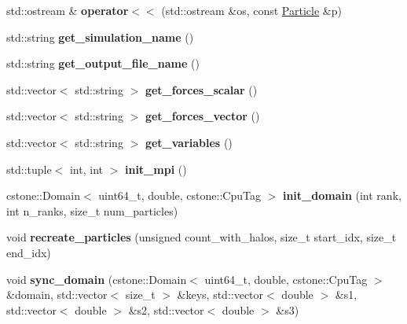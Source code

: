 \begin{DoxyCompactItemize}
\item 
\mbox{\label{namespacewash_abc2f2a24cba2a641e3a2177b85b20953}} 
std\+::ostream \& {\bfseries operator$<$$<$} (std\+::ostream \&os, const \mbox{\hyperlink{classwash_1_1Particle}{Particle}} \&p)
\item 
\mbox{\label{namespacewash_ae53e7d7035c2a890e62ce7687f173222}} 
std\+::string {\bfseries get\+\_\+simulation\+\_\+name} ()
\item 
\mbox{\label{namespacewash_a5ffed72aa633299d2cb1692076563f55}} 
std\+::string {\bfseries get\+\_\+output\+\_\+file\+\_\+name} ()
\item 
\mbox{\label{namespacewash_a0cac03b47f7ed36a343e0d42aa0f013a}} 
std\+::vector$<$ std\+::string $>$ {\bfseries get\+\_\+forces\+\_\+scalar} ()
\item 
\mbox{\label{namespacewash_a1b363919a60e27b3a13ee7eec7a3dcdb}} 
std\+::vector$<$ std\+::string $>$ {\bfseries get\+\_\+forces\+\_\+vector} ()
\item 
\mbox{\label{namespacewash_a1c3211b3b0c5f804ecd247b159703b68}} 
std\+::vector$<$ std\+::string $>$ {\bfseries get\+\_\+variables} ()
\item 
\mbox{\label{namespacewash_a24c5e20c82921f02f79e9947f7113f70}} 
std\+::tuple$<$ int, int $>$ {\bfseries init\+\_\+mpi} ()
\item 
\mbox{\label{namespacewash_a1473dce3a353e16eae7e13990f27a9b3}} 
cstone\+::\+Domain$<$ uint64\+\_\+t, double, cstone\+::\+Cpu\+Tag $>$ {\bfseries init\+\_\+domain} (int rank, int n\+\_\+ranks, size\+\_\+t num\+\_\+particles)
\item 
\mbox{\label{namespacewash_aba64dafc759621369351c22f65435fe6}} 
void {\bfseries recreate\+\_\+particles} (unsigned count\+\_\+with\+\_\+halos, size\+\_\+t start\+\_\+idx, size\+\_\+t end\+\_\+idx)
\item 
\mbox{\label{namespacewash_a075ba78df60938a5d76fe39041396f37}} 
void {\bfseries sync\+\_\+domain} (cstone\+::\+Domain$<$ uint64\+\_\+t, double, cstone\+::\+Cpu\+Tag $>$ \&domain, std\+::vector$<$ size\+\_\+t $>$ \&keys, std\+::vector$<$ double $>$ \&s1, std\+::vector$<$ double $>$ \&s2, std\+::vector$<$ double $>$ \&s3)

\end{DoxyCompactItemize}
